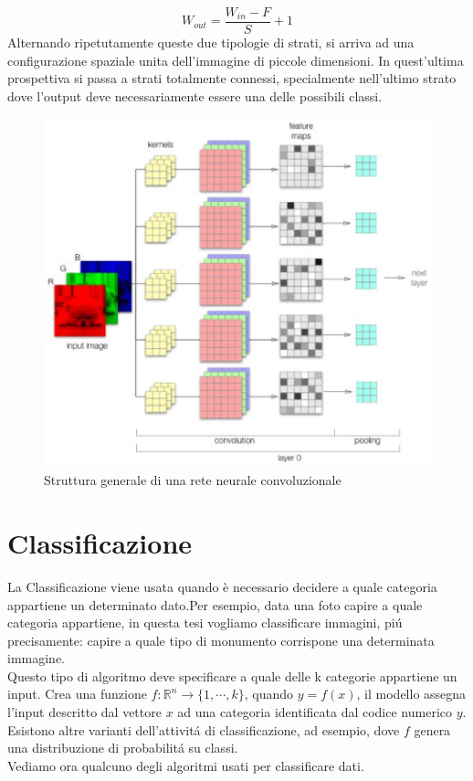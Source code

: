 \documentclass[a4paper,12pt,oneside]{book}
\begin{document}
\begin{equation}
W_{out}=\frac{W_{in} - F}{S}+1
\end{equation}
Alternando ripetutamente queste due tipologie di strati, si arriva ad una configurazione spaziale unita dell'immagine di piccole dimensioni. In quest'ultima prospettiva  si passa a strati totalmente connessi, specialmente nell'ultimo strato dove l'output deve necessariamente essere una delle possibili classi.
\begin{figure}[!h]
\centering
\includegraphics{panoramicaConv}
\caption{Struttura generale di una rete neurale convoluzionale}
\end{figure}



\chapter{Classificazione}\label{classificazione}
La Classificazione viene usata quando \`e necessario decidere a quale categoria appartiene un determinato dato.Per esempio, data una foto capire a quale categoria appartiene, in questa tesi vogliamo classificare immagini, pi\'{u} precisamente: capire a quale tipo di monumento corrispone una determinata immagine.\\ 
Questo tipo di algoritmo deve specificare a quale delle k categorie appartiene un input. Crea una funzione $f:\mathbb{R}^{n} \rightarrow \{ 1,\cdots,k\}$, quando $y=f(x)$, il modello assegna l'input descritto dal vettore $x$ ad una categoria identificata dal codice numerico $y$.\\
Esistono altre varianti dell'attivit\'{a} di classificazione, ad esempio, dove $f$ genera una distribuzione di probabilit\'{a} su classi.\\
Vediamo ora qualcuno degli algoritmi usati per classificare dati.
\end{document}
